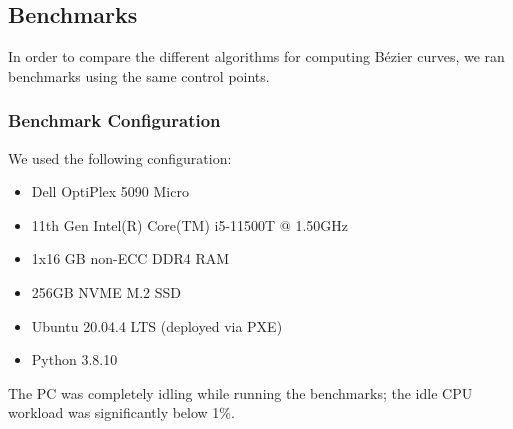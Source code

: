 \subsection{Benchmarks}
In order to compare the different algorithms for computing Bézier curves, we ran benchmarks using the same control points.
\subsubsection{Benchmark Configuration}
We used the following configuration:
\begin{itemize}
    \item Dell OptiPlex 5090 Micro
    \item 11th Gen Intel(R) Core(TM) i5-11500T @ 1.50GHz
    \item 1x16 GB non-ECC DDR4 RAM
    \item 256GB NVME M.2 SSD
    \item Ubuntu 20.04.4 LTS (deployed via PXE)
    \item Python 3.8.10
\end{itemize}
The PC was completely idling while running the benchmarks; the idle CPU workload was significantly below 1\%.

